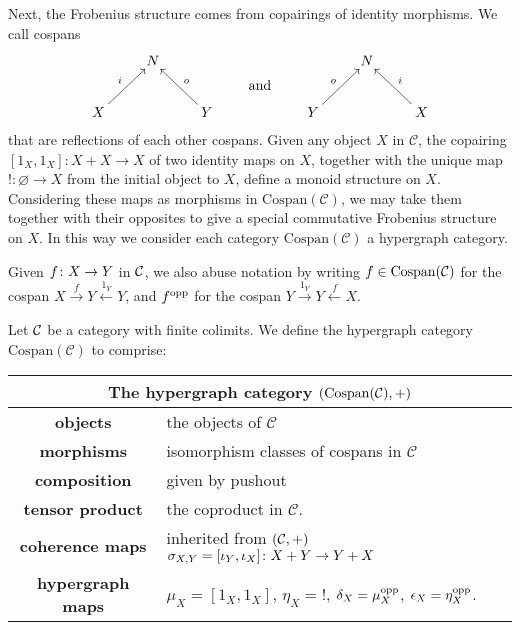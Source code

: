   Next, the Frobenius structure comes from copairings of identity morphisms. We
  call cospans 
  \[
    \xymatrix{
      & N \\
      X \ar[ur]^{i} && Y \ar[ul]_{o}
    }
    \qquad \xymatrix@R=8pt{\\\textrm{and}} \qquad 
    \xymatrix{
      & N \\
      Y \ar[ur]^{o} && X \ar[ul]_{i}
    }
  \]
  that are reflections of each other  cospans. Given any object
  $X$ in $\mathcal C$, the copairing $[1_X,1_X]\colon  X + X \to X$ of two identity
  maps on $X$, together with the unique map $!\colon  \varnothing \to X$ from the
  initial object to $X$, define a monoid structure on $X$. Considering these
  maps as morphisms in $\mathrm{Cospan(\mathcal C)}$, we may take them together
  with their opposites to give a special commutative Frobenius structure on $X$.
  In this way we consider each category $\mathrm{Cospan(\mathcal C)}$ a
  hypergraph category.

  Given $f {\colon} X \to Y$ in $\mathcal C$, we also abuse notation by writing $f \in
  \mathrm{Cospan}(\mathcal C)$ for the cospan $X \stackrel{f}\to Y
  \stackrel{1_Y}\leftarrow Y$, and $f^{\mathrm{opp}}$ for the cospan $Y \stackrel{1_Y}\to
  Y \stackrel{f}\leftarrow X$.

\begin{definition} \label{thm.cospanwelldef}
  Let $\mathcal C$ be a category with finite colimits. We define the hypergraph
  category $\mathrm{Cospan}(\mathcal C)$ to comprise:
  
  \begin{center}
  \begin{tabular}{ |c| p{}|}
      \hline
      \multicolumn{2}{|c|}{The hypergraph category $(\mathrm{Cospan(\mathcal C)},+)$} \\
    \hline
    \textbf{objects} & the objects of $\mathcal C$ \\ 
    \textbf{morphisms} & isomorphism classes of cospans in
    $\mathcal C$\\ 
  \textbf{composition} & given by pushout \\
  \textbf{tensor product} & the coproduct in $\mathcal C$. \\
  \textbf{coherence maps} & inherited from $(\mathcal C,+)$ $\sigma_{X,Y} = [\iota_Y,\iota_X] {\colon} X+Y
      \to Y+X$\\
  \textbf{hypergraph maps} & $\mu_X = [1_X,1_X]$, $\eta_X = !$,
      $\delta_X = \mu_X^{\mathrm{opp}}$, $\epsilon_X = \eta_X^{\mathrm{opp}}$. \\
      \hline
  \end{tabular}
\end{center}
\end{definition}
  
